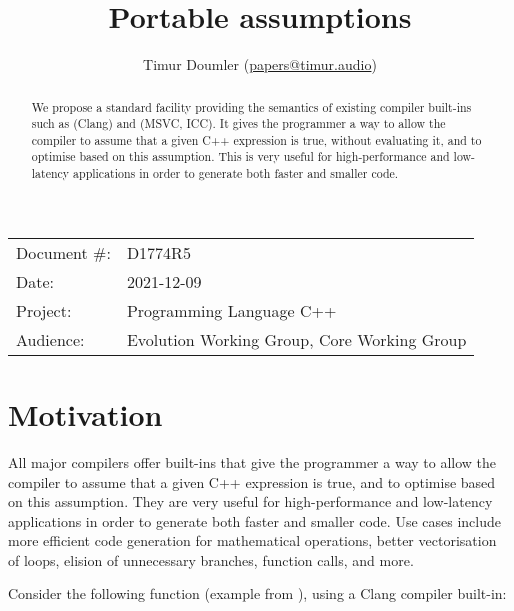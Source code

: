 

\newcommand{\forceindent}{\parindent=1em\indent\parindent=0pt\relax} %


\title{Portable assumptions}
\author{
  Timur Doumler \small(\href{mailto:papers@timur.audio}{papers@timur.audio})
}
\date{}
\maketitle

\begin{tabular}{ll}
Document \#: & D1774R5 \\
Date: & 2021-12-09\\
Project: & Programming Language C++ \\
Audience: & Evolution Working Group, Core Working Group
\end{tabular}


\begin{abstract}
We propose a standard facility providing the semantics of existing compiler built-ins such as  (Clang) and  (MSVC, ICC). It gives the programmer a way to allow the compiler to assume that a given C++ expression is true, without evaluating it, and to optimise based on this assumption. This is very useful for high-performance and low-latency applications in order to generate both faster and smaller code.
\end{abstract}

\vspace{5mm}

\section{Motivation}
\label{sec:motivation}

All major compilers offer built-ins that give the programmer a way to allow the compiler to assume that a given C++ expression is true, and to optimise based on this assumption. They are very useful for high-performance and low-latency applications in order to generate both faster and smaller code. Use cases include more efficient code generation for mathematical operations, better vectorisation of loops, elision of unnecessary branches, function calls, and more.

Consider the following function (example from \cite{Regehr2014}), using a Clang compiler built-in:

